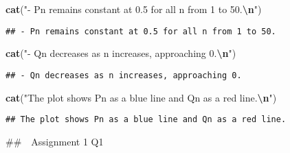 \documentclass[
]{article}
\newenvironment{Shaded}{\begin{snugshade}}{\end{snugshade}}
\newcommand{\FunctionTok}[1]{\textcolor[rgb]{0.13,0.29,0.53}{\textbf{#1}}}
\newcommand{\NormalTok}[1]{#1}
\newcommand{\SpecialCharTok}[1]{\textcolor[rgb]{0.81,0.36,0.00}{\textbf{#1}}}
\newcommand{\StringTok}[1]{\textcolor[rgb]{0.31,0.60,0.02}{#1}}
\begin{document}
\begin{Shaded}
\begin{Highlighting}[]
\FunctionTok{cat}\NormalTok{(}\StringTok{"{-} Pn remains constant at 0.5 for all n from 1 to 50.}\SpecialCharTok{\textbackslash{}n}\StringTok{"}\NormalTok{)}
\end{Highlighting}
\end{Shaded}

\begin{verbatim}
## - Pn remains constant at 0.5 for all n from 1 to 50.
\end{verbatim}

\begin{Shaded}
\begin{Highlighting}[]
\FunctionTok{cat}\NormalTok{(}\StringTok{"{-} Qn decreases as n increases, approaching 0.}\SpecialCharTok{\textbackslash{}n}\StringTok{"}\NormalTok{)}
\end{Highlighting}
\end{Shaded}

\begin{verbatim}
## - Qn decreases as n increases, approaching 0.
\end{verbatim}

\begin{Shaded}
\begin{Highlighting}[]
\FunctionTok{cat}\NormalTok{(}\StringTok{"The plot shows Pn as a blue line and Qn as a red line.}\SpecialCharTok{\textbackslash{}n}\StringTok{"}\NormalTok{)}
\end{Highlighting}
\end{Shaded}

\begin{verbatim}
## The plot shows Pn as a blue line and Qn as a red line.
\end{verbatim}

\#\#　Assignment 1 Q1
\end{document}

